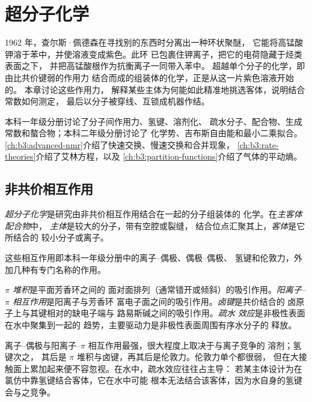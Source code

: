 \chapter{超分子化学}\label{ch:b3:supramolecular}

1962 年，查尔斯·佩德森在寻找别的东西时分离出一种环状聚醚，
它能将高锰酸钾溶于苯中，并使溶液变成紫色。此环
已包裹住钾离子，把它的电荷隐藏于烃类表面之下，
并把高锰酸根作为抗衡离子一同带入苯中。
超越单个分子的化学，即由比共价键弱的作用力
结合而成的组装体的化学，正是从这一片紫色溶液开始的。
本章讨论这些作用力，
解释某些主体为何能如此精准地挑选客体，说明结合常数如何测定，
最后以分子被穿线、互锁成机器作结。

\begin{recall}
本科一年级分册讨论了分子间作用力、氢键、溶剂化、
疏水分子、配合物、生成常数和螯合物；本科二年级分册讨论了
化学势、吉布斯自由能和最小二乘拟合。
\cref{ch:b3:advanced-nmr}介绍了快速交换、慢速交换和合并现象，
\cref{ch:b3:rate-theories}介绍了艾林方程，以及
\cref{ch:b3:partition-functions}介绍了气体的平动熵。
\end{recall}

\section{非共价相互作用}

\begin{definition}[超分子化学]\label{def:b3:supramolecular:supramolecular}
\emph{超分子化学}是研究由非共价相互作用结合在一起的分子组装体的
化学。在\emph{主客体配合物}中，
\emph{主体}是较大的分子，带有空腔或裂缝，
结合位点汇聚其上，\emph{客体}是它所结合的
较小分子或离子。
\end{definition}

这些相互作用即本科一年级分册中的离子–偶极、偶极–偶极、
氢键和伦敦力，外加几种有专门名称的作用。

\begin{definition}[非共价相互作用]\label{def:b3:supramolecular:interactions}
\emph{$\pi$ 堆积}是平面芳香环之间的
面对面排列（通常错开或倾斜）的吸引作用。\emph{阳离子–$\pi$
相互作用}是阳离子与芳香环
富电子面之间的吸引作用。\emph{卤键}是共价结合的
卤原子上与其键相对的缺电子端与
路易斯碱之间的吸引作用。\emph{疏水
效应}是非极性表面在水中聚集到一起的
趋势，主要驱动力是非极性表面周围有序水分子的
释放。
\end{definition}

离子–偶极与阳离子–$\pi$ 相互作用最强，很大程度上取决于与离子竞争的
溶剂；氢键次之，
其后是 $\pi$ 堆积与卤键，再其后是伦敦力。伦敦力单个都很弱，
但在大接触面上累加起来便不容忽视。在水中，疏水效应往往占主导：
若某主体设计为在氯仿中靠氢键结合客体，它在水中可能
根本无法结合该客体，因为水自身的氢键会与之竞争。

